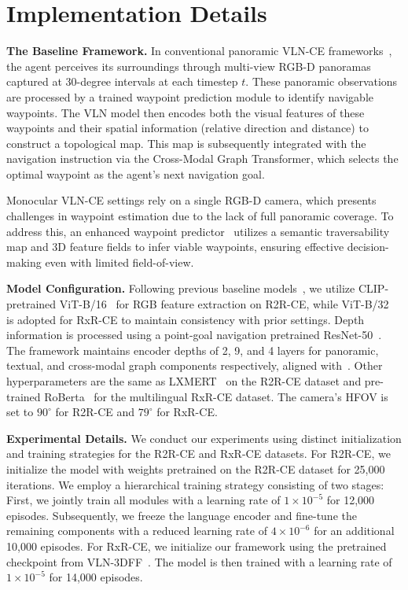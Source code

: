 \documentclass{article}
\theoremstyle{plain}
\theoremstyle{definition}
\theoremstyle{remark}
\begin{document}
\section{Implementation Details}\label{sec:detail}
\textbf{The Baseline Framework.}
In conventional panoramic VLN-CE frameworks~\cite{an2024etpnav, wang2023gridmm}, the agent perceives its surroundings through multi-view RGB-D panoramas captured at 30-degree intervals at each timestep $t$. These panoramic observations are processed by a trained waypoint prediction module\cite{Hong2022BridgingTG} to identify navigable waypoints. The VLN model then encodes both the visual features of these waypoints and their spatial information (relative direction and distance) to construct a topological map. This map is subsequently integrated with the navigation instruction via the Cross-Modal Graph Transformer\cite{chen2022think, an2024etpnav}, which selects the optimal waypoint as the agent’s next navigation goal.

Monocular VLN-CE settings rely on a single RGB-D camera, which presents challenges in waypoint estimation due to the lack of full panoramic coverage. To address this, an enhanced waypoint predictor~\cite{wang2024sim} utilizes a semantic traversability map and 3D feature fields to infer viable waypoints, ensuring effective decision-making even with limited field-of-view.

\noindent\textbf{Model Configuration.}
Following previous baseline models~\cite{an2024etpnav, wang2024sim}, we utilize CLIP-pretrained ViT-B/16~\cite{dosovitskiy2020image} for RGB feature extraction on R2R-CE, while ViT-B/32~\cite{dosovitskiy2020image} is adopted for RxR-CE to maintain consistency with prior settings. Depth information is processed using a point-goal navigation pretrained ResNet-50~\cite{he2016deep}.
The framework maintains encoder depths of 2, 9, and 4 layers for panoramic, textual, and cross-modal graph components respectively, aligned with~\cite{Hong2022BridgingTG, Georgakis2022CrossmodalML}.  Other hyperparameters are the same as LXMERT~\cite{tan2019lxmert} on the R2R-CE dataset and pre-trained RoBerta~\cite{liu2019roberta} for the multilingual RxR-CE dataset. The camera's HFOV is set to $90^{\circ}$ for R2R-CE and $79^{\circ}$ for RxR-CE.


\noindent\textbf{Experimental Details.}
We conduct our experiments using distinct initialization and training strategies for the R2R-CE and RxR-CE datasets.
For R2R-CE, we initialize the model with weights pretrained on the R2R-CE dataset for 25,000 iterations. We employ a hierarchical training strategy consisting of two stages: First, we jointly train all modules with a learning rate of $1 \times 10^{-5}$ for 12,000 episodes. Subsequently, we freeze the language encoder and fine-tune the remaining components with a reduced learning rate of $4 \times 10^{-6}$ for an additional 10,000 episodes.
For RxR-CE, we initialize our framework using the pretrained checkpoint from VLN-3DFF~\cite{wang2024sim}. The model is then trained with a learning rate of $1 \times 10^{-5}$ for 14,000 episodes.
\end{document}

